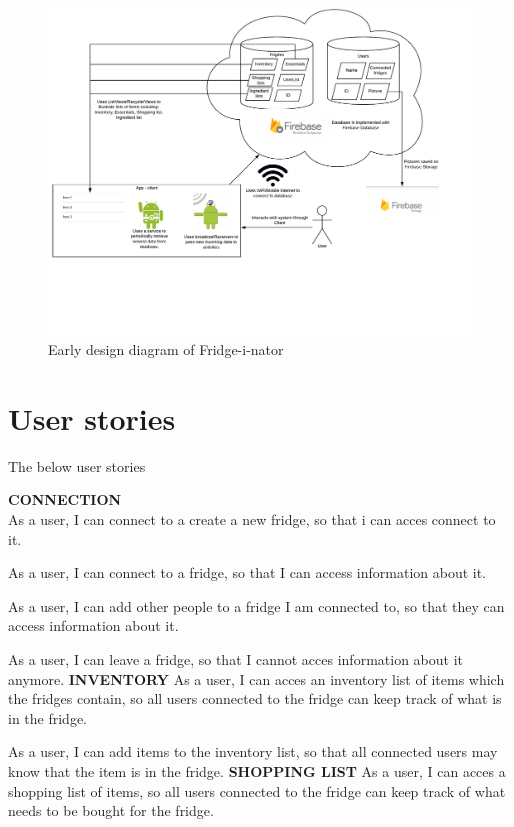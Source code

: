 \documentclass[12pt]{article}
\begin{document}
\begin{figure}[H]
	\centering
	\includegraphics[width=180mm]{Img/Fridge_some_diagram.pdf}
	\caption{Early design diagram of Fridge-i-nator}
	\label{fig:Design diagram}
\end{figure}

\section{User stories}
The below user stories 

\textbf{CONNECTION}\\
As a user, I can connect to a create a new fridge, so that i can acces connect to it.

As a user, I can connect to a fridge, so that I can access information about it.

As a user, I can add other people to a fridge I am connected to, so that they can access information about it.

As a user, I can leave a fridge, so that I cannot acces information about it anymore.
\newline
\newline
\textbf{INVENTORY}
As a user, I can acces an inventory list of items which the fridges contain, so all users connected to the fridge can keep track of what is in the fridge.

As a user, I can add items to the inventory list, so that all connected users may know that the item is in the fridge.
\newline
\newline
\textbf{SHOPPING LIST}
As a user, I can acces a shopping list of items, so all users connected to the fridge can keep track of what needs to be bought for the fridge.
\end{document}
